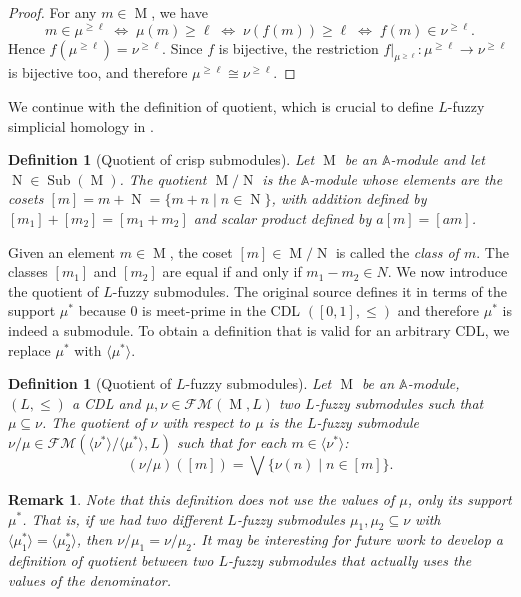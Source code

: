 \documentclass[a4paper,10pt]{article}
\newtheorem{definition}[theorem]{Definition}
\newtheorem{remark}[theorem]{Remark}
\newcommand{\bba}{\mathbb{A}}
\newcommand{\calfm}{\mathcal{F\!M}}
\DeclareMathOperator{\sub}{Sub}
\DeclareMathOperator{\Mo}{M}
\DeclareMathOperator{\No}{N}
\begin{document}
\begin{proof}
For any \(m\in\Mo\), we have
\[
m\in\mu^{\ge\ell}
\;\Longleftrightarrow\;
\mu(m)\ge\ell
\;\Longleftrightarrow\;
\nu(f(m))\ge\ell
\;\Longleftrightarrow\;
f(m)\in\nu^{\ge\ell}.
\]
Hence \(f(\mu^{\ge\ell})=\nu^{\ge\ell}\). Since \(f\) is bijective, the restriction \(f|_{\mu^{\ge\ell}} :\mu^{\ge\ell}\to\nu^{\ge\ell}\) is bijective too, and therefore \(\mu^{\ge\ell}\cong\nu^{\ge\ell}\).
\end{proof}

We continue with the definition of quotient, which is crucial to define \(L\)-fuzzy simplicial homology in .

\begin{definition}[Quotient of crisp submodules]
\label{def:quotient}
Let \(\Mo\) be an \(\bba\)-module and let \(\No \in \sub(\Mo)\). The \emph{quotient} \(\Mo/\No\) is the \(\bba\)-module whose elements are the cosets \([m] = m + \No=\{m+n\mid n \in \No\}\), with addition defined by \([m_1]+[m_2] = [m_1+m_2]\) and scalar product defined by \(a[m]=[am]\). 
\end{definition}

Given an element \(m \in \Mo\), the coset \([m] \in \Mo/\No\) is called the \emph{class of \(m\)}. The classes \([m_1]\) and \([m_2]\) are equal if and only if \(m_1 - m_2 \in N\).
We now introduce the quotient of \(L\)-fuzzy submodules. 
The original source \cite{ashok2020fuzzy} defines it in terms of the support \(\mu^*\) because \(0\) is meet-prime in the CDL \(([0,1],\leq)\) and therefore \(\mu^*\) is indeed a submodule. To obtain a definition that is valid for an arbitrary CDL, we replace \(\mu^*\) with \(\langle \mu^* \rangle\).

\begin{definition}[Quotient of \(L\)-fuzzy submodules]
\label{def:lfuzzyquotient}
Let \(\Mo\) be an \(\bba\)-module, \((L,\leq)\) a CDL and \(\mu, \nu \in \calfm(\Mo,L)\) two \(L\)-fuzzy submodules such that \(\mu \subseteq \nu\). The \emph{quotient of \(\nu\) with respect to \(\mu\)} is the \(L\)-fuzzy submodule \(\nu/\mu \in \calfm(\langle\nu^*\rangle/\langle\mu^*\rangle,L)\) such that for each \(m \in \langle\nu^*\rangle\):
\[
(\nu/\mu)([m]) = \bigvee \{\nu(n) \mid n \in [m]\}.
\]
\end{definition}

\begin{remark}
Note that this definition does not use the values of \(\mu\), only its support \(\mu^*\). That is, if we had two different \(L\)-fuzzy submodules \(\mu_1,\mu_2 \subseteq \nu\) with \(\langle\mu_1^*\rangle = \langle\mu_2^*\rangle\), then \(\nu/\mu_1 = \nu/\mu_2\). It may be interesting for future work to develop a definition of quotient between two \(L\)-fuzzy submodules that actually uses the values of the denominator.
\end{remark}
\end{document}
